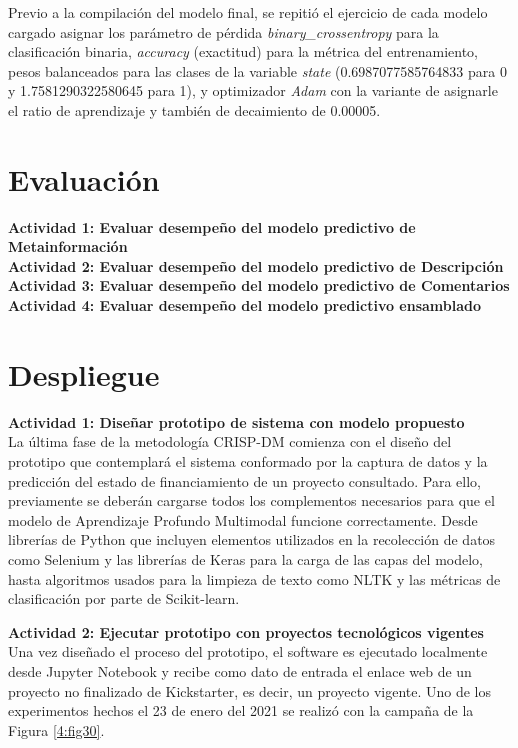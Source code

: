 Previo a la compilación del modelo final, se repitió el ejercicio de cada modelo cargado asignar los parámetro de pérdida \textit{binary\_crossentropy} para la clasificación binaria, \textit{accuracy} (exactitud) para la métrica del entrenamiento, pesos balanceados para las clases de la variable \textit{state} (0.6987077585764833 para 0 y 1.7581290322580645 para 1), y optimizador \textit{Adam} con la variante de asignarle el ratio de aprendizaje y también de decaimiento de 0.00005.

\section{Evaluación}
\textbf{Actividad 1: Evaluar desempeño del modelo predictivo de Metainformación}
\\

\textbf{Actividad 2: Evaluar desempeño del modelo predictivo de Descripción}
\\

\textbf{Actividad 3: Evaluar desempeño del modelo predictivo de Comentarios}
\\

\textbf{Actividad 4: Evaluar desempeño del modelo predictivo ensamblado}
\\

\section{Despliegue}
\textbf{Actividad 1: Diseñar prototipo de sistema con modelo propuesto}
\\
La última fase de la metodología CRISP-DM comienza con el diseño del prototipo que contemplará el sistema conformado por la captura de datos y la predicción del estado de financiamiento de un proyecto consultado. Para ello, previamente se deberán cargarse todos los complementos necesarios para que el modelo de Aprendizaje Profundo Multimodal funcione correctamente. Desde librerías de Python que incluyen elementos utilizados en la recolección de datos como Selenium y las librerías de Keras para la carga de las capas del modelo, hasta algoritmos usados para la limpieza de texto como NLTK y las métricas de clasificación por parte de Scikit-learn.

\textbf{Actividad 2: Ejecutar prototipo con proyectos tecnológicos vigentes}
\\
Una vez diseñado el proceso del prototipo, el software es ejecutado localmente desde Jupyter Notebook y recibe como dato de entrada el enlace web de un proyecto no finalizado de Kickstarter, es decir, un proyecto vigente. Uno de los experimentos hechos el 23 de enero del 2021 se realizó con la campaña de la Figura \ref{4:fig30}.

